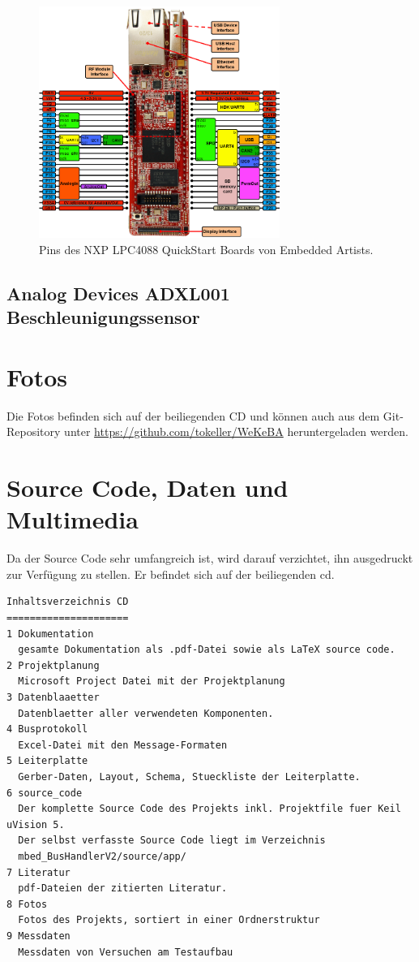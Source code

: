 \begin{figure}
	\centering		\includegraphics[width=0.7\textwidth]{images/datasheets/LPC4088_QSB_pinning_revA_800x769.png}
	\caption{Pins des NXP LPC4088 QuickStart Boards von Embedded Artists.}
	\label{fig.NXP_LPC4088_QSB_pinout}
\end{figure}



\subsection{Analog Devices ADXL001 Beschleunigungssensor}



\section{Fotos}\label{sec.foto.testaufbau}
Die Fotos befinden sich auf der beiliegenden CD und können auch aus dem Git-Repository unter \url{https://github.com/tokeller/WeKeBA} heruntergeladen werden.

\section{Source Code, Daten und Multimedia}\label{app.cd}
Da der Source Code sehr umfangreich ist, wird darauf verzichtet, ihn ausgedruckt zur Verfügung zu stellen. Er befindet sich auf der beiliegenden \gls{cd}.


\begin{lstlisting}[caption=Inhaltsverzeichnis CD, label=list.cd]
Inhaltsverzeichnis CD
=====================
1 Dokumentation
  gesamte Dokumentation als .pdf-Datei sowie als LaTeX source code.
2 Projektplanung
  Microsoft Project Datei mit der Projektplanung
3 Datenblaaetter
  Datenblaetter aller verwendeten Komponenten. 
4 Busprotokoll
  Excel-Datei mit den Message-Formaten
5 Leiterplatte
  Gerber-Daten, Layout, Schema, Stueckliste der Leiterplatte.
6 source_code
  Der komplette Source Code des Projekts inkl. Projektfile fuer Keil uVision 5. 
  Der selbst verfasste Source Code liegt im Verzeichnis 
  mbed_BusHandlerV2/source/app/
7 Literatur
  pdf-Dateien der zitierten Literatur.
8 Fotos
  Fotos des Projekts, sortiert in einer Ordnerstruktur
9 Messdaten
  Messdaten von Versuchen am Testaufbau
\end{lstlisting}
